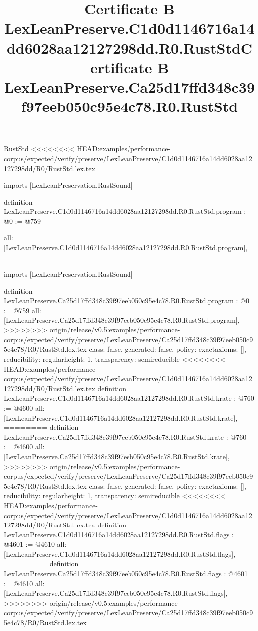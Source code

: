 \begin{lexlean}{RustStd}
<<<<<<<< HEAD:examples/performance-corpus/expected/verify/preserve/LexLeanPreserve/C1d0d1146716a14dd6028aa12127298dd/R0/RustStd.lex.tex
\title{Certificate B LexLeanPreserve.C1d0d1146716a14dd6028aa12127298dd.R0.RustStd}
\begin{coremodule}
imports [LexLeanPreservation.RustSound]

definition LexLeanPreserve.C1d0d1146716a14dd6028aa12127298dd.R0.RustStd.program : @0 := @759 {
  all: [LexLeanPreserve.C1d0d1146716a14dd6028aa12127298dd.R0.RustStd.program],
========
\title{Certificate B LexLeanPreserve.Ca25d17ffd348c39f97eeb050c95e4c78.R0.RustStd}
\begin{coremodule}
imports [LexLeanPreservation.RustSound]

definition LexLeanPreserve.Ca25d17ffd348c39f97eeb050c95e4c78.R0.RustStd.program : @0 := @759 {
  all: [LexLeanPreserve.Ca25d17ffd348c39f97eeb050c95e4c78.R0.RustStd.program],
>>>>>>>> origin/release/v0.5:examples/performance-corpus/expected/verify/preserve/LexLeanPreserve/Ca25d17ffd348c39f97eeb050c95e4c78/R0/RustStd.lex.tex
  class: false,
  generated: false,
  policy: exact{axioms: []},
  reducibility: regular{height: 1},
  transparency: semireducible
}
<<<<<<<< HEAD:examples/performance-corpus/expected/verify/preserve/LexLeanPreserve/C1d0d1146716a14dd6028aa12127298dd/R0/RustStd.lex.tex
definition LexLeanPreserve.C1d0d1146716a14dd6028aa12127298dd.R0.RustStd.krate : @760 := @4600 {
  all: [LexLeanPreserve.C1d0d1146716a14dd6028aa12127298dd.R0.RustStd.krate],
========
definition LexLeanPreserve.Ca25d17ffd348c39f97eeb050c95e4c78.R0.RustStd.krate : @760 := @4600 {
  all: [LexLeanPreserve.Ca25d17ffd348c39f97eeb050c95e4c78.R0.RustStd.krate],
>>>>>>>> origin/release/v0.5:examples/performance-corpus/expected/verify/preserve/LexLeanPreserve/Ca25d17ffd348c39f97eeb050c95e4c78/R0/RustStd.lex.tex
  class: false,
  generated: false,
  policy: exact{axioms: []},
  reducibility: regular{height: 1},
  transparency: semireducible
}
<<<<<<<< HEAD:examples/performance-corpus/expected/verify/preserve/LexLeanPreserve/C1d0d1146716a14dd6028aa12127298dd/R0/RustStd.lex.tex
definition LexLeanPreserve.C1d0d1146716a14dd6028aa12127298dd.R0.RustStd.flags : @4601 := @4610 {
  all: [LexLeanPreserve.C1d0d1146716a14dd6028aa12127298dd.R0.RustStd.flags],
========
definition LexLeanPreserve.Ca25d17ffd348c39f97eeb050c95e4c78.R0.RustStd.flags : @4601 := @4610 {
  all: [LexLeanPreserve.Ca25d17ffd348c39f97eeb050c95e4c78.R0.RustStd.flags],
>>>>>>>> origin/release/v0.5:examples/performance-corpus/expected/verify/preserve/LexLeanPreserve/Ca25d17ffd348c39f97eeb050c95e4c78/R0/RustStd.lex.tex
}}}
\end{coremodule}}
\end{coremodule}
\end{lexlean}
